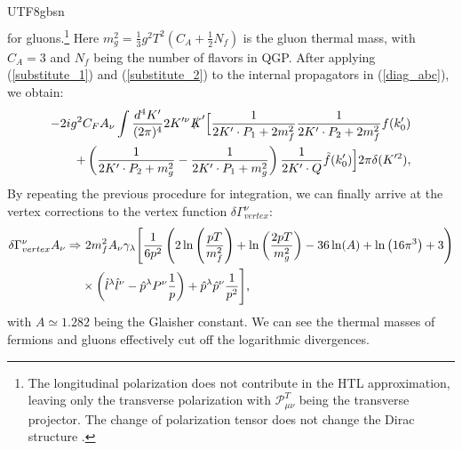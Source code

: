 \documentclass[11pt]{article}\def\baselinestretch{1.4}
\def\({\left(}
\def\){\right)}
\begin{document}
\begin{CJK}{UTF8}{gbsn}
\begin{align}
\end{align}
for gluons.\footnote{The longitudinal polarization does not contribute in the HTL approximation, leaving only the transverse polarization with $\mathcal{P}^T_{\mu \nu }$ being the transverse projector. The change of polarization tensor does not change the Dirac structure \cite{Lin:2023ass}.} Here $m_g^2=\frac{1}{3}g^2T^2(C_A+\frac{1}{2}N_f)$ is the gluon thermal mass, with $C_A=3$ and $N_f$ being the number of flavors in QGP.
 After applying (\ref{substitute_1}) and (\ref{substitute_2}) to the internal propagators in (\ref{diag_abc}), we obtain:
\begin{align}
\begin{split}
-2ig^2C_F A_\nu \int\frac{d^{4} K'}{( 2\pi )^{4}} 2K'^\nu \slashed{K}' \Big[ \frac{1}{2K'\cdot P_1+2m_f^2}\frac{1}{2K'\cdot P_2+2m_f^2}f(k'_0) \\
+ \left(\frac{1}{2K'\cdot P_2+m_g^2}-\frac{1}{2K'\cdot P_1+m_g^2}\right)\frac{1}{2K'\cdot Q}\tilde{f}(k'_0) \Big] 2\pi \delta (K'^2) ,
\end{split}
\end{align}
By repeating the previous procedure for integration, we can finally arrive at the vertex corrections to the vertex function $\delta \Gamma^\nu_{vertex}$:
\begin{align}\label{vertex_corr}
\delta \Gamma_{vertex} ^\nu A_\nu \Rightarrow&\ 2 m_f^2 A_\nu \gamma _\lambda \Bigg{[} \frac{1}{6 p^2}\(2 \ln \left(\frac{pT}{m_f^2}\right)+\ln \left(\frac{2 pT}{m_{g }^2}\right) 
-36 \ln (A)+\ln \left(16 \pi ^3 \right)+3\)\nonumber\\
&\times\left(\hat{l}^\lambda \hat{l}^\nu - \hat{p}^\lambda P^\nu \frac{1}{p} \right) + \hat{p}^\lambda \hat{p}^\nu \frac{1}{p^2} \Bigg{]},
\end{align}
with $A\simeq 1.282$ being the Glaisher constant. We can see the thermal masses of fermions and gluons effectively cut off the logarithmic divergences.


\end{CJK}
\end{document}
